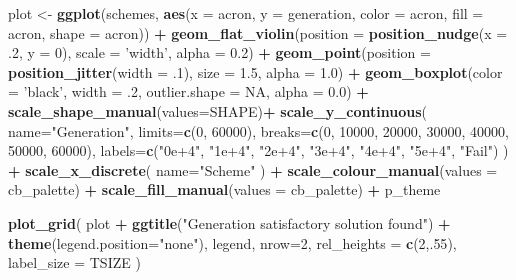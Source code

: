 \documentclass[]{book}
\newenvironment{Shaded}{\begin{snugshade}}{\end{snugshade}}
\newcommand{\DataTypeTok}[1]{\textcolor[rgb]{0.13,0.29,0.53}{#1}}
\newcommand{\DecValTok}[1]{\textcolor[rgb]{0.00,0.00,0.81}{#1}}
\newcommand{\FloatTok}[1]{\textcolor[rgb]{0.00,0.00,0.81}{#1}}
\newcommand{\KeywordTok}[1]{\textcolor[rgb]{0.13,0.29,0.53}{\textbf{#1}}}
\newcommand{\NormalTok}[1]{#1}
\newcommand{\OperatorTok}[1]{\textcolor[rgb]{0.81,0.36,0.00}{\textbf{#1}}}
\newcommand{\OtherTok}[1]{\textcolor[rgb]{0.56,0.35,0.01}{#1}}
\newcommand{\StringTok}[1]{\textcolor[rgb]{0.31,0.60,0.02}{#1}}
\begin{document}
\begin{Shaded}
\begin{Highlighting}[]
\NormalTok{plot <-}\StringTok{ }\KeywordTok{ggplot}\NormalTok{(schemes, }\KeywordTok{aes}\NormalTok{(}\DataTypeTok{x =}\NormalTok{ acron, }\DataTypeTok{y =}\NormalTok{ generation, }\DataTypeTok{color =}\NormalTok{ acron, }\DataTypeTok{fill =}\NormalTok{ acron, }\DataTypeTok{shape =}\NormalTok{ acron)) }\OperatorTok{+}
\StringTok{  }\KeywordTok{geom_flat_violin}\NormalTok{(}\DataTypeTok{position =} \KeywordTok{position_nudge}\NormalTok{(}\DataTypeTok{x =} \FloatTok{.2}\NormalTok{, }\DataTypeTok{y =} \DecValTok{0}\NormalTok{), }\DataTypeTok{scale =} \StringTok{'width'}\NormalTok{, }\DataTypeTok{alpha =} \FloatTok{0.2}\NormalTok{) }\OperatorTok{+}
\StringTok{  }\KeywordTok{geom_point}\NormalTok{(}\DataTypeTok{position =} \KeywordTok{position_jitter}\NormalTok{(}\DataTypeTok{width =} \FloatTok{.1}\NormalTok{), }\DataTypeTok{size =} \FloatTok{1.5}\NormalTok{, }\DataTypeTok{alpha =} \FloatTok{1.0}\NormalTok{) }\OperatorTok{+}
\StringTok{  }\KeywordTok{geom_boxplot}\NormalTok{(}\DataTypeTok{color =} \StringTok{'black'}\NormalTok{, }\DataTypeTok{width =} \FloatTok{.2}\NormalTok{, }\DataTypeTok{outlier.shape =} \OtherTok{NA}\NormalTok{, }\DataTypeTok{alpha =} \FloatTok{0.0}\NormalTok{) }\OperatorTok{+}
\StringTok{  }\KeywordTok{scale_shape_manual}\NormalTok{(}\DataTypeTok{values=}\NormalTok{SHAPE)}\OperatorTok{+}
\StringTok{  }\KeywordTok{scale_y_continuous}\NormalTok{(}
    \DataTypeTok{name=}\StringTok{"Generation"}\NormalTok{,}
    \DataTypeTok{limits=}\KeywordTok{c}\NormalTok{(}\DecValTok{0}\NormalTok{, }\DecValTok{60000}\NormalTok{),}
    \DataTypeTok{breaks=}\KeywordTok{c}\NormalTok{(}\DecValTok{0}\NormalTok{, }\DecValTok{10000}\NormalTok{, }\DecValTok{20000}\NormalTok{, }\DecValTok{30000}\NormalTok{, }\DecValTok{40000}\NormalTok{, }\DecValTok{50000}\NormalTok{, }\DecValTok{60000}\NormalTok{),}
    \DataTypeTok{labels=}\KeywordTok{c}\NormalTok{(}\StringTok{"0e+4"}\NormalTok{, }\StringTok{"1e+4"}\NormalTok{, }\StringTok{"2e+4"}\NormalTok{, }\StringTok{"3e+4"}\NormalTok{, }\StringTok{"4e+4"}\NormalTok{, }\StringTok{"5e+4"}\NormalTok{, }\StringTok{"Fail"}\NormalTok{)}
\NormalTok{  ) }\OperatorTok{+}
\StringTok{  }\KeywordTok{scale_x_discrete}\NormalTok{(}
    \DataTypeTok{name=}\StringTok{"Scheme"}
\NormalTok{  ) }\OperatorTok{+}
\StringTok{  }\KeywordTok{scale_colour_manual}\NormalTok{(}\DataTypeTok{values =}\NormalTok{ cb_palette) }\OperatorTok{+}
\StringTok{  }\KeywordTok{scale_fill_manual}\NormalTok{(}\DataTypeTok{values =}\NormalTok{ cb_palette) }\OperatorTok{+}
\StringTok{  }\NormalTok{p_theme}

\KeywordTok{plot_grid}\NormalTok{(}
\NormalTok{  plot }\OperatorTok{+}
\StringTok{    }\KeywordTok{ggtitle}\NormalTok{(}\StringTok{"Generation satisfactory solution found"}\NormalTok{) }\OperatorTok{+}
\StringTok{    }\KeywordTok{theme}\NormalTok{(}\DataTypeTok{legend.position=}\StringTok{"none"}\NormalTok{),}
\NormalTok{  legend,}
  \DataTypeTok{nrow=}\DecValTok{2}\NormalTok{,}
  \DataTypeTok{rel_heights =} \KeywordTok{c}\NormalTok{(}\DecValTok{2}\NormalTok{,.}\DecValTok{55}\NormalTok{),}
  \DataTypeTok{label_size =}\NormalTok{ TSIZE}
\NormalTok{)}
\end{Highlighting}
\end{Shaded}
\end{document}
